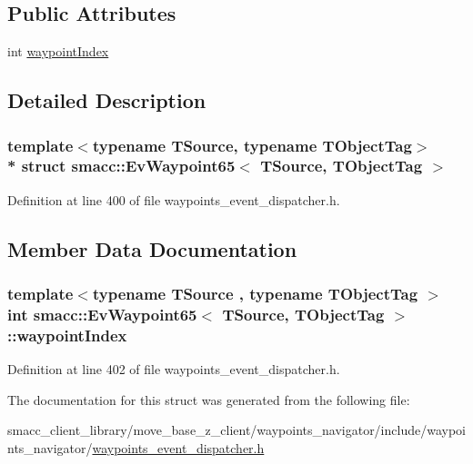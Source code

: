 \subsection*{Public Attributes}
\begin{DoxyCompactItemize}
\item 
int \hyperlink{structsmacc_1_1EvWaypoint65_aebe8cad8581c371b5b909bd33fb9108a}{waypoint\+Index}
\end{DoxyCompactItemize}


\subsection{Detailed Description}
\subsubsection*{template$<$typename T\+Source, typename T\+Object\+Tag$>$\\*
struct smacc\+::\+Ev\+Waypoint65$<$ T\+Source, T\+Object\+Tag $>$}



Definition at line 400 of file waypoints\+\_\+event\+\_\+dispatcher.\+h.



\subsection{Member Data Documentation}
\subsubsection[{\texorpdfstring{waypoint\+Index}{waypointIndex}}]{\setlength{\rightskip}{0pt plus 5cm}template$<$typename T\+Source , typename T\+Object\+Tag $>$ int {\bf smacc\+::\+Ev\+Waypoint65}$<$ T\+Source, T\+Object\+Tag $>$\+::waypoint\+Index}\hypertarget{structsmacc_1_1EvWaypoint65_aebe8cad8581c371b5b909bd33fb9108a}{}\label{structsmacc_1_1EvWaypoint65_aebe8cad8581c371b5b909bd33fb9108a}


Definition at line 402 of file waypoints\+\_\+event\+\_\+dispatcher.\+h.



The documentation for this struct was generated from the following file\+:\begin{DoxyCompactItemize}
\item 
smacc\+\_\+client\+\_\+library/move\+\_\+base\+\_\+z\+\_\+client/waypoints\+\_\+navigator/include/waypoints\+\_\+navigator/\hyperlink{waypoints__event__dispatcher_8h}{waypoints\+\_\+event\+\_\+dispatcher.\+h}\end{DoxyCompactItemize}
